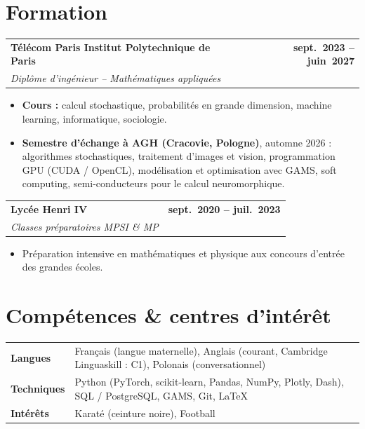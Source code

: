 \documentclass[a4paper,10pt]{article}
\makeatletter
\newcommand{\cventry}[4]{%
  \noindent
  \begin{tabularx}{\textwidth}{@{}X@{\hspace{6pt}}r@{}}
    \textbf{#1} & \textbf{#3}\\
    \textit{#2} & \\
  \end{tabularx}
  \par\vspace{-1pt}
  #4
  \vspace{5pt}
}
\makeatother
\begin{document}
\section{Formation}

\cventry{T\'el\'ecom Paris \textbar{} Institut Polytechnique de Paris}%
  {Dipl\^ome d'ing\'enieur -- Math\'ematiques appliqu\'ees}{sept.~2023 -- juin~2027}{%
  \begin{itemize}
    \item \textbf{Cours :} calcul stochastique, probabilit\'es en grande dimension, machine learning, informatique, sociologie.
    \item \textbf{Semestre d'\'echange \`a AGH (Cracovie, Pologne)}, automne 2026 : algorithmes stochastiques, traitement d'images et vision, programmation GPU (CUDA / OpenCL), mod\'elisation et optimisation avec GAMS, soft computing, semi-conducteurs pour le calcul neuromorphique.
  \end{itemize}
}

\cventry{Lyc\'ee Henri IV}%
  {Classes pr\'eparatoires MPSI \& MP}{sept.~2020 -- juil.~2023}{%
  \begin{itemize}
    \item Pr\'eparation intensive en math\'ematiques et physique aux concours d'entr\'ee des grandes \'ecoles.
  \end{itemize}
}

\section{Comp\'etences \& centres d'int\'er\^et}

\begin{tabularx}{\textwidth}{@{}>{\bfseries}p{2.1cm} X@{}}
  Langues     & Fran\c{c}ais (langue maternelle), Anglais (courant, Cambridge Linguaskill : C1), Polonais (conversationnel) \\[2pt]
  Techniques  & Python (PyTorch, scikit-learn, Pandas, NumPy, Plotly, Dash), SQL / PostgreSQL, GAMS, Git, \LaTeX{} \\[2pt]
  Int\'er\^ets   & Karat\'e (ceinture noire), Football \\
\end{tabularx}
\end{document}
